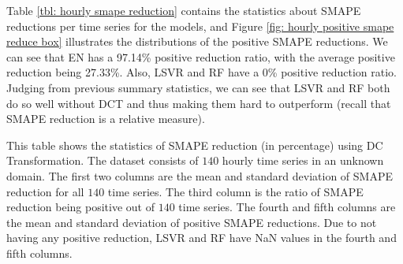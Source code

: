 Table \ref{tbl: hourly smape reduction} contains the statistics about SMAPE reductions per time series for the models, and Figure \ref{fig: hourly positive smape reduce box} illustrates the distributions of the positive SMAPE reductions. We can see that EN has a 97.14\% positive reduction ratio, with the average positive reduction being 27.33\%. Also, LSVR and RF have a 0\% positive reduction ratio. Judging from previous summary statistics, we can see that LSVR and RF both do so well without DCT and thus making them hard to outperform (recall that SMAPE reduction is a relative measure).
\begin{table}[H]
    \caption{Statistics of SMAPE reduction (\%) using DCT (hourly unknown)}
    {\raggedright \footnotesize This table shows the statistics of SMAPE reduction (in percentage) using DC Transformation. The dataset consists of $140$ hourly time series in an unknown domain. The first two columns are the mean and standard deviation of SMAPE reduction for all $140$ time series. The third column is the ratio of SMAPE reduction being positive out of $140$ time series. The fourth and fifth columns are the mean and standard deviation of positive SMAPE reductions. Due to not having any positive reduction, LSVR and RF have NaN values in the fourth and fifth columns. \par}
    \label{tbl: hourly smape reduction}
\end{table}
